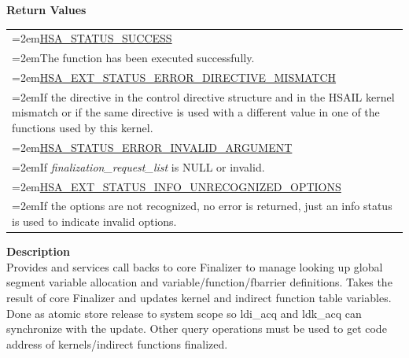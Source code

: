 \documentclass[final]{book}
\begin{document}
\vspace{-5mm}\noindent\textbf{Return Values}\\[-6mm]
\noindent\begin{longtable}{@{}>{\hangindent=2em}p{\linewidth}}
\hyperlink{group__status_1ggad755322e7ff95456520e8abdbe90d225ae382ea0c9c05cce5a60d0317375159cc}{HSA_STATUS_SUCCESS}\\\hspace{2em}The function has been executed successfully.\\[2mm]
\hyperlink{group__status_1ggad755322e7ff95456520e8abdbe90d225ae16bcc443d027a0b880fd58f0443227b}{HSA_EXT_STATUS_ERROR_DIRECTIVE_MISMATCH}\\\hspace{2em}If the directive in the control directive structure and in the HSAIL kernel mismatch or if the same directive is used with a different value in one of the functions used by this kernel.\\[2mm]
\hyperlink{group__status_1ggad755322e7ff95456520e8abdbe90d225ac7d3651f75107d2a6a8ba3b25683c030}{HSA_STATUS_ERROR_INVALID_ARGUMENT}\\\hspace{2em}If \textit{finalization_request_list} is NULL or invalid.\\[2mm]
\hyperlink{group__status_1ggad755322e7ff95456520e8abdbe90d225a60343279bea68766b037297915b5f903}{HSA_EXT_STATUS_INFO_UNRECOGNIZED_OPTIONS}\\\hspace{2em}If the options are not recognized, no error is returned, just an info status is used to indicate invalid options.
\end{longtable}
\vspace{-4mm}\noindent\textbf{Description}\\[1mm]
Provides and services call backs to core Finalizer to manage looking up global segment variable allocation and variable/function/fbarrier definitions. Takes the result of core Finalizer and updates kernel and indirect function table variables. Done as atomic store release to system scope so ldi_acq and ldk_acq can synchronize with the update. Other query operations must be used to get code address of kernels/indirect functions finalized. 
\end{document}
